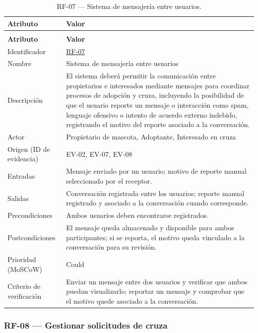 \documentclass[journal,onecolumn]{IEEEtran}
\makeatletter
\newenvironment{atributos}[2]{%
	\small
	\begin{longtable}{@{}>{\raggedright\arraybackslash}p{4.2cm} >{\raggedright\arraybackslash}p{11.2cm}@{}}
		\caption{#2}\label{tab:#1}\\
		\toprule
		\textbf{Atributo} & \textbf{Valor} \\
		\midrule
		\endfirsthead
		\multicolumn{2}{@{}l}{\small\itshape (continuación)}\\
		\toprule
		\textbf{Atributo} & \textbf{Valor} \\
		\midrule
		\endhead
		\bottomrule
		\endlastfoot
	}{%
	\end{longtable}
	\normalsize
}
\makeatother
\begin{document}
	\begin{atributos}{RF-07}{RF-07 --- Sistema de mensajería entre usuarios.}
		Identificador & \hyperref[tab:RF-07]{RF-07} \\
		Nombre & Sistema de mensajería entre usuarios \\
		Descripción & El sistema deberá permitir la comunicación entre propietarios e interesados mediante mensajes para coordinar procesos de adopción y cruza, incluyendo la posibilidad de que el usuario reporte un mensaje o interacción como spam, lenguaje ofensivo o intento de acuerdo externo indebido, registrando el motivo del reporte asociado a la conversación. \\
		Actor & Propietario de mascota, Adoptante, Interesado en cruza \\
		Origen (ID de evidencia) & EV-02, EV-07, EV-08 \\
		Entradas & Mensaje enviado por un usuario; motivo de reporte manual seleccionado por el receptor. \\
		Salidas & Conversación registrada entre los usuarios; reporte manual registrado y asociado a la conversación cuando corresponde. \\
		Precondiciones & Ambos usuarios deben encontrarse registrados. \\
		Postcondiciones & El mensaje queda almacenado y disponible para ambos participantes; si se reporta, el motivo queda vinculado a la conversación para su revisión. \\
		Prioridad (MoSCoW) & Could \\
		Criterio de verificación & Enviar un mensaje entre dos usuarios y verificar que ambos puedan visualizarlo; reportar un mensaje y comprobar que el motivo quede asociado a la conversación. \\
	\end{atributos}
	

	\subsubsection{RF-08 --- Gestionar solicitudes de cruza}
	
\end{document}
